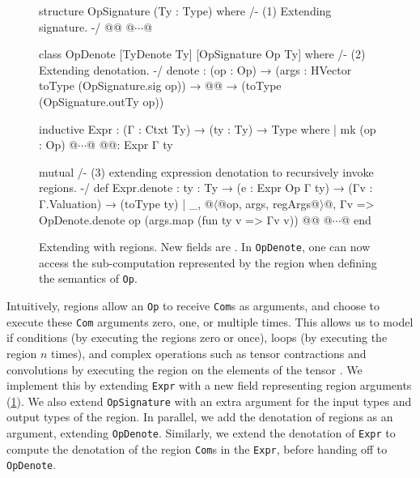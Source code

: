 \begin{figure}
\begin{leanfootnotesize}
structure OpSignature (Ty : Type) where /- (1) Extending signature. -/
@@
@$\cdots$@

class OpDenote [TyDenote Ty] [OpSignature Op Ty] where /- (2) Extending denotation. -/
denote : (op : Op) → (args : HVector toType (OpSignature.sig op)) →
@@ →
(toType (OpSignature.outTy op))

inductive Expr : (Γ : Ctxt Ty) → (ty : Ty) → Type where
| mk (op : Op)
@$\cdots$@
@@:
Expr Γ ty

mutual /- (3) extending expression denotation to recursively invoke regions. -/
def Expr.denote : {ty : Ty} → (e : Expr Op Γ ty) → (Γv : Γ.Valuation) → (toType ty)
| _, @$\langle$@op, args, regArgs@$\rangle$@, Γv =>
OpDenote.denote op (args.map (fun ty v => Γv v)) @@
@$\cdots$@
end
\end{leanfootnotesize}
\caption{\label{fig:mlir:mechanization-regions} Extending  with regions.
New fields are .
In \texttt{OpDenote}, one can now access the sub-computation represented by the region when defining the semantics of \texttt{Op}.}
\end{figure}

Intuitively, regions allow an \texttt{Op} to receive \texttt{Com}s as arguments, and choose to execute these \texttt{Com} arguments zero, one, or multiple times.
This allows us to model if conditions (by executing the regions zero or once), loops (by executing the region $n$ times), and complex operations such as tensor contractions and convolutions by executing the region on the elements of the tensor \cite{linalg}.
We implement this by extending \texttt{Expr} with a new field representing region arguments (\cref{fig:mlir:mechanization-regions}).
We also extend \texttt{OpSignature} with an extra argument for the input types and output types of the region.
In parallel, we add the denotation of regions as an argument, extending \texttt{OpDenote}.
Similarly, we extend the denotation of \texttt{Expr} to compute the denotation of the region \texttt{Com}s in the \texttt{Expr}, before handing off to \texttt{OpDenote}.


